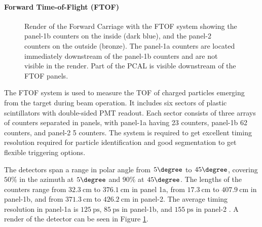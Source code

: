 \paragraph{Forward Time-of-Flight (FTOF)}
    \begin{figure}
        \centering{}
        \caption[FTOF]{Render of the Forward Carriage with the FTOF system showing the panel-1b counters on the inside (dark blue), and the panel-2 counters on the outside (bronze).
        The panel-1a counters are located immediately downstream of the panel-1b counters and are not visible in the render.
        Part of the PCAL is visible downstream of the FTOF panels.}
        \label{fig::ftof}
    \end{figure}

    The FTOF system is used to measure the TOF of charged particles emerging from the target during beam operation.
    It includes six sectors of plastic scintillators with double-sided PMT readout.
    Each sector consists of three arrays of counters separated in panels, with panel-1a having 23 counters, panel-1b 62 counters, and panel-2 5 counters.
    The system is required to get excellent timing resolution required for particle identification and good segmentation to get flexible triggering options.

    The detectors span a range in polar angle from $5\degree$ to $45\degree$, covering $50\%$ in the azimuth at $5\degree$ and $90\%$ at $45\degree$.
    The lengths of the counters range from $32.3 ~\text{cm}$ to $376.1 ~\text{cm}$ in panel 1a, from $17.3 ~\text{cm}$ to $407.9 ~\text{cm}$ in panel-1b, and from $371.3 ~\text{cm}$ to $426.2 ~\text{cm}$ in panel-2.
    The average timing resolution in panel-1a is $125 ~\text{ps}$, $85 ~\text{ps}$ in panel-1b, and $155 ~\text{ps}$ in panel-2 \cite{carman2020ftof}.
    A render of the detector can be seen in Figure \ref{fig::ftof}.
